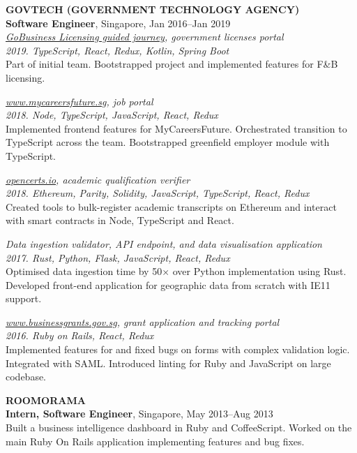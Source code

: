 \documentclass[line, margin]{res}
\begin{document}
\begin{resume}
        \textbf{GOVTECH (GOVERNMENT TECHNOLOGY AGENCY)} \\
        \textbf{Software Engineer}, Singapore, Jan 2016--Jan 2019
        \\
        \textit{\href{https://foodservices.gobusiness.gov.sg/licences/foodservices}{GoBusiness Licensing guided journey}, government licenses portal} \\
        \textit{2019. TypeScript, React, Redux, Kotlin, Spring Boot} \\
        Part of initial team. Bootstrapped project and implemented features for F\&B licensing.
        
        \textit{\href{https://www.mycareersfuture.sg}{www.mycareersfuture.sg}, job portal} \\
        \textit{2018. Node, TypeScript, JavaScript, React, Redux} \\
        Implemented frontend features for MyCareersFuture. Orchestrated transition to TypeScript across the team. Bootstrapped greenfield employer module with TypeScript.

        \textit{\href{https://opencerts.io/}{opencerts.io}, academic qualification verifier} \\
        \textit{2018. Ethereum, Parity, Solidity, JavaScript, TypeScript, React, Redux} \\
        Created tools to bulk-register academic transcripts on Ethereum and interact with smart contracts in Node, TypeScript and React.

        \textit{Data ingestion validator, API endpoint, and data visualisation application} \\
        \textit{2017. Rust, Python, Flask, JavaScript, React, Redux} \\
        Optimised data ingestion time by 50$\times$ over Python implementation using Rust.
        Developed front-end application for geographic data from scratch with IE11 support.

        \textit{\href{https://www.businessgrants.gov.sg/}{www.businessgrants.gov.sg}, grant application and tracking portal} \\
        \textit{2016. Ruby on Rails, React, Redux} \\
        Implemented features for and fixed bugs on forms with complex validation logic.
        Integrated with SAML.
        Introduced linting for Ruby and JavaScript on large codebase.

        \pagebreak

        \textbf{ROOMORAMA} \\
        \textbf{Intern, Software Engineer}, Singapore, May 2013--Aug 2013 \\
        Built a business intelligence dashboard in Ruby and CoffeeScript. Worked on the main Ruby On Rails application implementing features and bug fixes.


\end{resume}
\end{document}
